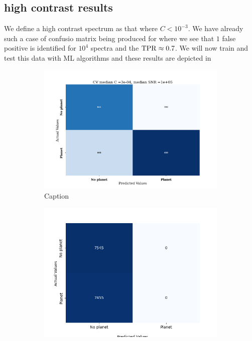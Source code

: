 \subsection{high contrast results}
We define a high contrast spectrum as that where $C<10^{-3}$.
We have already such a case of confusio matrix being produced for  where we see that $1$ false positive is identified for $10^{4}$ spectra  and the $\rm{TPR}\approx 0.7$.
We will now train and test this data with ML algorithms and these results are depicted in 
\begin{figure}
\begin{subfigure}{0.4\textwidth}
        \centering
        \includegraphics[scale=0.3]{images/Chapter3/confusion_RF_CV_1e-04_cmax_1e-03_dsnrmin_1e+04_dsnrmax_1e+06.png}
        \caption{Caption}
        \label{fig:highcont_rf}
\end{subfigure}
\hfill
\begin{subfigure}{0.4\textwidth}
        \includegraphics[scale=0.4]{images/Chapter3/confusion_mlp_1e-5_keras_train.png}

\end{subfigure}
\end{figure}
